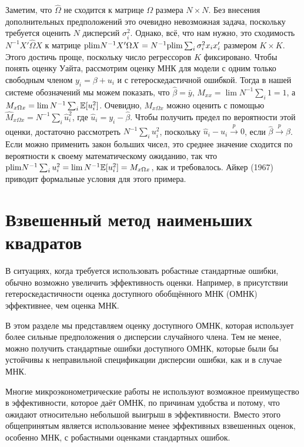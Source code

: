 Заметим, что $\hat{\Omega}$ не сходится к матрице $\Omega$ размера $N \times N$. Без внесения дополнительных предположений это очевидно невозможная задача, поскольку требуется оценить $N$ дисперсий $\sigma_i^2$. Однако, всё, что нам нужно, это сходимость $N^{-1} X' \hat{\Omega} X$ к матрице $\mathrm{plim } N^{-1} X' \Omega X =  N^{-1} \mathrm{plim } \sum_i \sigma_i^2 x_i x_i'$  размером $K \times K$. Этого достичь проще, поскольку число регрессоров $K$ фиксировано. Чтобы понять оценку Уайта, рассмотрим оценку МНК для модели с одним только свободным членом $y_i = \beta + u_i$ и с гетероскедастичной ошибкой. Тогда в нашей системе обозначений мы можем показать, что $\hat{\beta} = \bar{y}$, $M_{xx} = \lim N^{-1} \sum_{i} 1 = 1$, а $M_{x \Omega x} = \lim N^{-1} \sum_{i} \mathbb{E}[u_i^2]$. Очевидно, $M_{x \Omega x}$ можно оценить с помощью $\hat{M}_{x \Omega x} = N^{-1} \sum_{i} \hat{u}_i^2$, где $ \hat{u}_i = y_i-\hat{\beta}$. Чтобы получить предел по вероятности этой оценки, достаточно рассмотреть $N^{-1}\sum_i u_i^2$, поскольку $\hat{u}_i - u_i \xrightarrow{p} 0$, если $\hat{\beta}\xrightarrow{p}\beta$. Если можно применить закон больших чисел, это среднее значение сходится по вероятности к своему математическому ожиданию, так что $\mathrm{plim } N^{-1} \sum_i u_i^2 = \lim N^{-1} \mathbb{E}[u_i^2] = M_{x \Omega x}$, как и требовалось. Айкер (1967) приводит формальные условия для этого примера.

\section{Взвешенный метод наименьших квадратов}

В ситуациях, когда требуется использовать робастные стандартные ошибки, обычно возможно увеличить эффективность оценки. Например, в присутствии гетероскедастичности оценка доступного обобщённого МНК (ОМНК) эффективнее, чем оценка МНК.

В этом разделе мы представляем оценку доступного ОМНК, которая использует более сильные предположения о дисперсии случайного члена. Тем не менее, можно получить стандартные ошибки доступного ОМНК, которые были бы устойчивы к неправильной спецификации дисперсии ошибки, как и в случае МНК.

Многие микроэконометрические работы не используют возможное преимущество в эффективности, которое даёт ОМНК, по причинам удобства и потому, что ожидают относительно небольшой выигрыш в эффективности. Вместо этого общепринятым является использование менее эффективных взвешенных оценок, особенно МНК, с робастными оценками стандартных ошибок.

